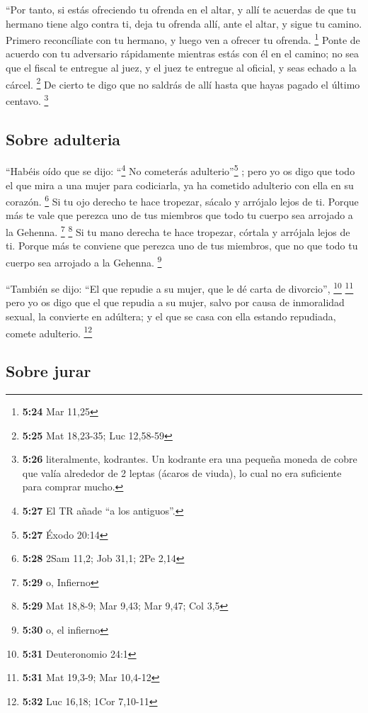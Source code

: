 \begin{paracol}{2}
 ``Por tanto, si estás ofreciendo tu ofrenda en el altar,
y allí te acuerdas de que tu hermano tiene algo contra ti,
 deja tu ofrenda allí, ante el altar, y sigue tu camino.
Primero reconcíliate con tu hermano, y luego ven a ofrecer tu ofrenda.
\footnote{\textbf{5:24} Mar 11,25}  Ponte de acuerdo con
tu adversario rápidamente mientras estás con él en el camino; no sea que
el fiscal te entregue al juez, y el juez te entregue al oficial, y seas
echado a la cárcel. \footnote{\textbf{5:25} Mat 18,23-35; Luc 12,58-59}
 De cierto te digo que no saldrás de allí hasta que hayas
pagado el último centavo. \footnote{\textbf{5:26} literalmente,
  kodrantes. Un kodrante era una pequeña moneda de cobre que valía
  alrededor de 2 leptas (ácaros de viuda), lo cual no era suficiente
  para comprar mucho.}

\hypertarget{sobre-adulteria}{%
\subsection{Sobre adulteria}\label{sobre-adulteria}}

 ``Habéis oído que se dijo: ``\footnote{\textbf{5:27} El
  TR añade ``a los antiguos''.} No cometerás adulterio''\footnote{\textbf{5:27}
  Éxodo 20:14} ;  pero yo os digo que todo el que mira a
una mujer para codiciarla, ya ha cometido adulterio con ella en su
corazón. \footnote{\textbf{5:28} 2Sam 11,2; Job 31,1; 2Pe 2,14}
 Si tu ojo derecho te hace tropezar, sácalo y arrójalo
lejos de ti. Porque más te vale que perezca uno de tus miembros que todo
tu cuerpo sea arrojado a la Gehenna. \footnote{\textbf{5:29} o, Infierno}
\footnote{\textbf{5:29} Mat 18,8-9; Mar 9,43; Mar 9,47; Col 3,5}
 Si tu mano derecha te hace tropezar, córtala y arrójala
lejos de ti. Porque más te conviene que perezca uno de tus miembros, que
no que todo tu cuerpo sea arrojado a la Gehenna. \footnote{\textbf{5:30}
  o, el infierno}

 ``También se dijo: ``El que repudie a su mujer, que le
dé carta de divorcio'', \footnote{\textbf{5:31} Deuteronomio 24:1}
\footnote{\textbf{5:31} Mat 19,3-9; Mar 10,4-12}  pero yo
os digo que el que repudia a su mujer, salvo por causa de inmoralidad
sexual, la convierte en adúltera; y el que se casa con ella estando
repudiada, comete adulterio. \footnote{\textbf{5:32} Luc 16,18; 1Cor
  7,10-11}

\hypertarget{sobre-jurar}{%
\subsection{Sobre jurar}\label{sobre-jurar}}


\end{paracol}
